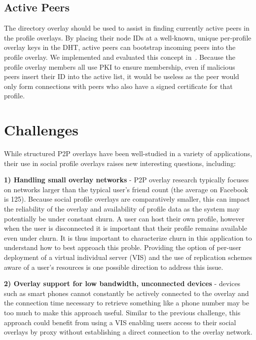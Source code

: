 \documentclass[letterpaper,twocolumn,10pt]{article}
\begin{document}
\subsection{Active Peers}
The directory overlay should be used to assist in finding currently active peers
in the profile overlays.  By placing their node IDs at a well-known, unique
per-profile overlay keys in the DHT, active peers can bootstrap incoming peers
into the profile overlay.  We implemented and evaluated this concept
in~\cite{icdcs10}.  Because the profile overlay members all use PKI to ensure
membership, even if malicious peers insert their ID into the active list, it
would be useless as the peer would only form connections with peers who also
have a signed certificate for that profile.

\section{Challenges}
\label{outstanding}
While structured P2P overlays have been well-studied in a variety of applications,
their use in social profile overlays raises new interesting questions, including:

{\bf 1) Handling small overlay networks} - P2P overlay research typically focuses on
networks larger than the typical user's friend count (the average on Facebook
is 125).  Because social profile overlays are comparatively smaller, this can
impact the reliability of the overlay and availability of profile data as the
system may potentially be under constant churn. A user can host their
own profile, however when the user is disconnected it is important that their
profile remains available even under churn. It is thus important to characterize churn
in this application to understand how to best approach this proble. Providing the option
of per-user deployment of a virtual individual server (VIS) and the use of replication 
schemes aware of a user's resources is one possible direction to address this issue.


{\bf 2) Overlay support for low bandwidth, unconnected devices} - devices such as
smart phones cannot constantly be actively connected to the overlay and the
connection time necessary to retrieve something like a phone number may be
too much to make this approach useful.  Similar to the previous challenge,
this approach could benefit from using a VIS enabling users access to their
social overlays by proxy without establishing a direct connection to the overlay
network.
\end{document}
